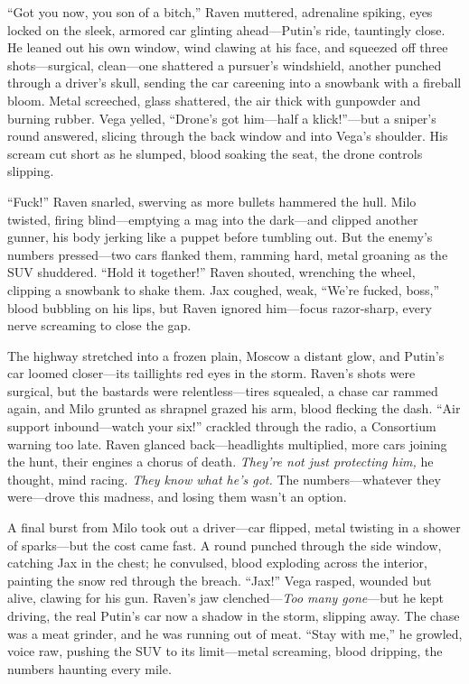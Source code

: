 \documentclass[12pt]{book}
\begin{document}
“Got you now, you son of a bitch,” Raven muttered, adrenaline spiking, eyes locked on the sleek, armored car glinting ahead—Putin’s ride, tauntingly close. He leaned out his own window, wind clawing at his face, and squeezed off three shots—surgical, clean—one shattered a pursuer’s windshield, another punched through a driver’s skull, sending the car careening into a snowbank with a fireball bloom. Metal screeched, glass shattered, the air thick with gunpowder and burning rubber. Vega yelled, “Drone’s got him—half a klick!”—but a sniper’s round answered, slicing through the back window and into Vega’s shoulder. His scream cut short as he slumped, blood soaking the seat, the drone controls slipping.

“Fuck!” Raven snarled, swerving as more bullets hammered the hull. Milo twisted, firing blind—emptying a mag into the dark—and clipped another gunner, his body jerking like a puppet before tumbling out. But the enemy’s numbers pressed—two cars flanked them, ramming hard, metal groaning as the SUV shuddered. “Hold it together!” Raven shouted, wrenching the wheel, clipping a snowbank to shake them. Jax coughed, weak, “We’re fucked, boss,” blood bubbling on his lips, but Raven ignored him—focus razor-sharp, every nerve screaming to close the gap.

The highway stretched into a frozen plain, Moscow a distant glow, and Putin’s car loomed closer—its taillights red eyes in the storm. Raven’s shots were surgical, but the bastards were relentless—tires squealed, a chase car rammed again, and Milo grunted as shrapnel grazed his arm, blood flecking the dash. “Air support inbound—watch your six!” crackled through the radio, a Consortium warning too late. Raven glanced back—headlights multiplied, more cars joining the hunt, their engines a chorus of death. \textit{They’re not just protecting him,} he thought, mind racing. \textit{They know what he’s got.} The numbers—whatever they were—drove this madness, and losing them wasn’t an option.

A final burst from Milo took out a driver—car flipped, metal twisting in a shower of sparks—but the cost came fast. A round punched through the side window, catching Jax in the chest; he convulsed, blood exploding across the interior, painting the snow red through the breach. “Jax!” Vega rasped, wounded but alive, clawing for his gun. Raven’s jaw clenched—\textit{Too many gone}—but he kept driving, the real Putin’s car now a shadow in the storm, slipping away. The chase was a meat grinder, and he was running out of meat. “Stay with me,” he growled, voice raw, pushing the SUV to its limit—metal screaming, blood dripping, the numbers haunting every mile.
\end{document}

